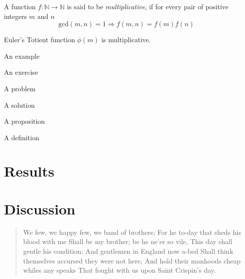 \documentclass[
draft
]{sta-thesis}
\begin{document}
\begin{definition}
A function $f:\mathbb{N}\rightarrow\mathbb{N}$ is said to be \emph{multiplicative}, if for every pair of positive integers $m$ and $n$
\[
\mathrm{gcd}(m,n)=1\Rightarrow f(m,n)=f(m)f(n)
\]
\end{definition}

\begin{lemma}
Euler's Totient function $\phi(m)$ is multiplicative.
\end{lemma}

\begin{example}
An example
\end{example}

\begin{exercise}
An exercise
\end{exercise}

\begin{problem}
A problem
\end{problem}

\begin{solution}
A solution
\end{solution}

\begin{proposition}
A proposition
\end{proposition}


\begin{definition}
A definition
\end{definition}

\begin{note}
\lipsum[1]
\end{note}

\begin{remark}
\lipsum[1]
\end{remark}

\chapter{Results}

\lipsum
\chapter{Discussion}

\begin{quote}
We few, we happy few, we band of brothers;
For he to-day that sheds his blood with me
Shall be my brother; be he ne'er so vile,
This day shall gentle his condition:
And gentlemen in England now a-bed
Shall think themselves accursed they were not here,
And hold their manhoods cheap whiles any speaks
That fought with us upon Saint Crispin's day.
\end{quote}
\end{document}
